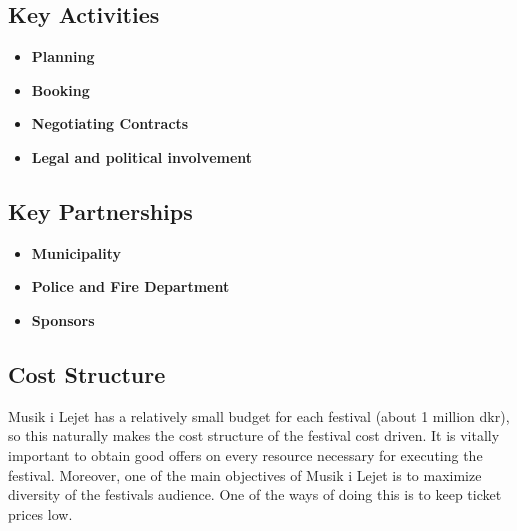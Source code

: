 \subsection{Key Activities} %
\label{sub:key_activities}
\begin{itemize}
	\item \textbf{Planning}\\
	\item \textbf{Booking}\\
	\item \textbf{Negotiating Contracts}\\
	\item \textbf{Legal and political involvement}\\
\end{itemize}

\subsection{Key Partnerships} %
\label{sub:key_partnerships}
\begin{itemize}
	\item \textbf{Municipality}\\
	\item \textbf{Police and Fire Department}\\
	\item \textbf{Sponsors}\\
\end{itemize}

\subsection{Cost Structure} %
\label{sub:cost_structure}
Musik i Lejet has a relatively small budget for each festival (about 1 million dkr), so this naturally makes the cost structure of the festival cost driven. It is vitally important to obtain good offers on every resource necessary for executing the festival. Moreover, one of the main objectives of Musik i Lejet is to maximize diversity of the festivals audience. One of the ways of doing this is to keep ticket prices low.